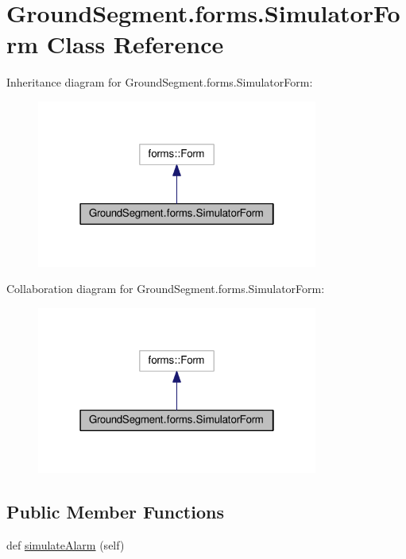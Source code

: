 \hypertarget{class_ground_segment_1_1forms_1_1_simulator_form}{}\section{Ground\+Segment.\+forms.\+Simulator\+Form Class Reference}
\label{class_ground_segment_1_1forms_1_1_simulator_form}


Inheritance diagram for Ground\+Segment.\+forms.\+Simulator\+Form\+:\nopagebreak
\begin{figure}[H]
\begin{center}
\leavevmode
\includegraphics[width=262pt]{class_ground_segment_1_1forms_1_1_simulator_form__inherit__graph}
\end{center}
\end{figure}


Collaboration diagram for Ground\+Segment.\+forms.\+Simulator\+Form\+:\nopagebreak
\begin{figure}[H]
\begin{center}
\leavevmode
\includegraphics[width=262pt]{class_ground_segment_1_1forms_1_1_simulator_form__coll__graph}
\end{center}
\end{figure}
\subsection*{Public Member Functions}
\begin{DoxyCompactItemize}
\item 
def \hyperlink{class_ground_segment_1_1forms_1_1_simulator_form_ace0c644ebdfef20d1a374e40a7b2f824}{simulate\+Alarm} (self)
\end{DoxyCompactItemize}


